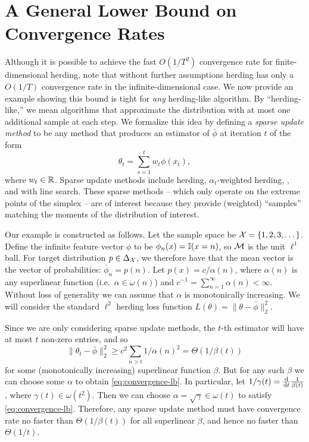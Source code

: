 \documentclass[paper.tex]{subfiles}
\begin{document}
\section{A General Lower Bound on Convergence Rates}
\label{sec:lower-bounds}

Although it is possible to achieve the fast $O(1/T^{2})$ convergence rate for finite-dimensional herding, \citet{Bach:2012a} note that without further assumptions herding has only a $O(1/T)$ convergence rate in the infinite-dimensional case. We now provide an example showing this bound is tight for {\em any} herding-like algorithm.  By ``herding-like,'' we mean algorithms that approximate the distribution with at most one additional sample at each step. We formalize this idea by defining a {\em sparse update method} to be any method that produces an estimator of $\bar \phi$ at iteration $t$ of the form 
\[
\theta_{t} = \sum_{s =1}^{t}w_{t} \phi(x_{t}),
\]
where $w_{t} \in \mathbb{R}$. Sparse update methods include herding, $\alpha_{t}$-weighted herding, \cgd, and  \cgd with line search. These sparse methods -- which only operate on the extreme points of the simplex -- are of interest because they provide (weighted) ``samples'' matching the moments of the distribution of interest. 

Our example is constructed as follows. Let the sample space be $\mathcal{X} = \{ 1, 2, 3, \dots\}$. Define the infinite feature vector $\phi$ to be $\phi_{n}(x) = \mathbb{I}(x = n)$, so $\mathcal{M}$ is the unit $\ell^{1}$ ball. For target distribution $p \in \Delta_{\mathcal{X}}$, we therefore have  that the mean vector is the vector of probabilities: $\bar\phi_{n} = p(n)$. Let $p(x) = c/\alpha(n)$, where $\alpha(n)$ is any superlinear function (i.e.~$\alpha \in \omega(n)$) and $c^{-1} = \sum_{n=1}^{\infty} \alpha(n) < \infty$. Without loss of generality we can assume that $\alpha$ is monotonically increasing.  We will consider the standard $\ell^{2}$ herding loss function $L(\theta) = \|\theta - \bar \phi\|_2^2$. 

Since we are only considering sparse update methods, the $t$-th estimator will have at most $t$ non-zero entries, and so 
\[
\|\theta_{t}- \bar \phi\|_2^2 \ge c^{2}\sum_{n > t} 1/\alpha(n)^{2} = \Theta(1/\beta(t)) \label{eq:convergence-lb}
\]
for some (monotonically increasing) superlinear function $\beta$. But for any such $\beta$ we can choose some $\alpha$ to obtain \eqref{eq:convergence-lb}. In particular, let $1/\gamma(t) = \frac{\mathrm{d}}{\mathrm{d} t}\frac{1}{\beta(t)}$, where $\gamma(t) \in \omega(t^{2})$. Then we can choose $\alpha = \sqrt \gamma \in \omega(t)$ to satisfy \eqref{eq:convergence-lb}. Therefore, any sparse update method must have convergence rate no faster than $\Theta(1/\beta(t))$ for all superlinear $\beta$, and hence no faster than $\Theta(1/t)$. 
\end{document}
